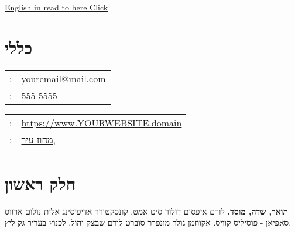 \setRTL
\hspace{.25\textwidth}
\begin{minipage}[t]{1.0\textwidth}
\par{\par}
\end{minipage}
%
\begin{minipage}[t]{1.0\textwidth}
{\footnotesize\hfill{}\color{gray}
\hfill{}\hyperref[sec:basicinfoeng]{English in read to here Click} %
}
\end{minipage}
%
\section{כללי} %
\label{sec:basicinfoheb}
\unsetRTL
\setLTR
\begin{minipage}[t]{.5\linewidth}
\begin{tabular}{rp{.75\linewidth}}
\baselineskip=20pt
\email{} :   & \href{mailto:youremail@mail.com}{youremail@mail.com}\\
\phone{} : &\href{tel:5555555}{555 5555} \\
\end{tabular}
\end{minipage}
\begin{minipage}[t]{.5\linewidth}
\begin{tabular}{rl}
\www{} : &\href{https://www.YOURWEBSITE.domain}{https://www.YOURWEBSITE.domain} \\
\location{} : &\href{YOU-MAY-LINK-YOUR-ADDRESS-HERE}{מחוז עיר,}
\end{tabular}
\end{minipage}	
\unsetLTR
\unsetRTL
\setRTL
%
%
\section{חלק ראשון} %

{\textbf{תואר, שדה, מוסד.}}
{לורם איפסום דולור סיט אמט, קונסקטורר אדיפיסינג אלית נולום ארווס סאפיאן - פוסיליס קוויס. אקווזמן גולר מונפרר סוברט לורם שבצק יהול, לכנוץ בעריר גק ליץ.}
{}

